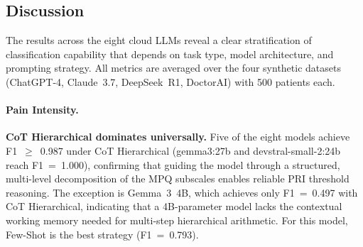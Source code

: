 \documentclass[preprint,12pt,authoryear]{elsarticle}
\begin{document}
\begin{table}[t!]
\centering
\caption{Pain Etiology classification: binary F1-score per model and prompting strategy, averaged over the four synthetic datasets. ZS\,=\,Zero-Shot; CoT-S\,=\,CoT Simple; CoT-V\,=\,CoT Verification; FS\,=\,Few-Shot; KG\,=\,Knowledge-Guided (Wilkie et al.). Bold\,=\,best per model.\label{tab:rq2_etio}}
\end{table}

\subsection{Discussion}

The results across the eight cloud LLMs reveal a clear stratification of classification capability that depends on task type, model architecture, and prompting strategy. All metrics are averaged over the four synthetic datasets (ChatGPT-4, Claude~3.7, DeepSeek~R1, DoctorAI) with 500 patients each.

\paragraph{Pain Intensity.}
\textbf{CoT Hierarchical dominates universally.} Five of the eight models achieve F1~$\geq$~0.987 under CoT Hierarchical (gemma3:27b and devstral-small-2:24b reach F1~=~1.000), confirming that guiding the model through a structured, multi-level decomposition of the MPQ subscales enables reliable PRI threshold reasoning. The exception is Gemma~3~4B, which achieves only F1~=~0.497 with CoT Hierarchical, indicating that a 4B-parameter model lacks the contextual working memory needed for multi-step hierarchical arithmetic. For this model, Few-Shot is the best strategy (F1~=~0.793).
\end{document}
